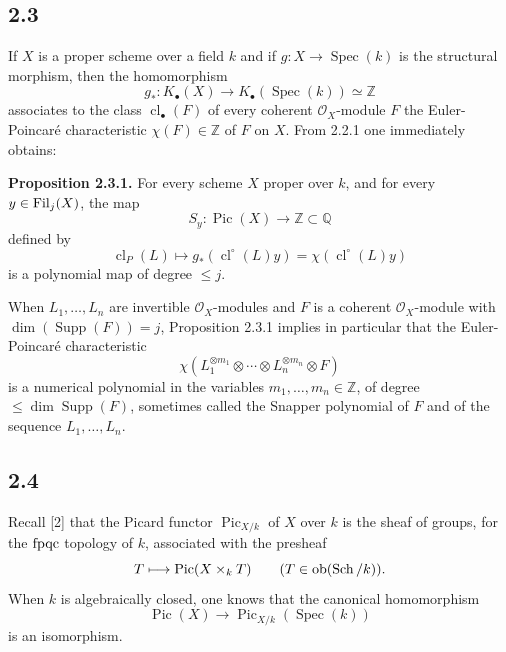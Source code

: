 \documentclass[11pt]{article}
\newcommand{\cl}{\operatorname{cl}}
\newcommand{\Spec}{\operatorname{Spec}}
\providecommand{\Pic}{\operatorname{Pic}}
\providecommand{\Supp}{\operatorname{Supp}}
\begin{document}
\subsection*{2.3}
If $X$ is a proper scheme over a field $k$ and if $g:X\to\Spec(k)$ is the structural morphism, then the homomorphism
\[
 g_*:K_\bullet(X)\longrightarrow K_\bullet(\Spec(k))\simeq\mathbb Z
\]
associates to the class $\cl_\bullet(F)$ of every coherent $\mathcal O_X$-module $F$ the Euler-Poincaré characteristic $\chi(F)\in\mathbb Z$ of $F$ on $X$. From 2.2.1 one immediately obtains:

\textbf{Proposition 2.3.1.} For every scheme $X$ proper over $k$, and for every $y\in\Filt_j(X)$, the map
\[
 S_y:\Pic(X)\longrightarrow\mathbb Z\subset\mathbb Q
\]
defined by
\[
 \cl_P(L)\longmapsto g_*(\cl^\circ(L)y)=\chi(\cl^\circ(L)y)
\]
is a polynomial map of degree $\leq j$.

When $L_1,\ldots,L_n$ are invertible $\mathcal O_X$-modules and $F$ is a coherent $\mathcal O_X$-module with $\dim(\Supp(F))=j$, Proposition 2.3.1 implies in particular that the Euler-Poincaré characteristic
\begin{equation}\tag{2.3.2}
 \chi(L_1^{\otimes m_1}\otimes\cdots\otimes L_n^{\otimes m_n}\otimes F)
\end{equation}
is a numerical polynomial in the variables $m_1,\ldots,m_n\in\mathbb Z$, of degree $\leq \dim\Supp(F)$, sometimes called the Snapper polynomial of $F$ and of the sequence $L_1,\ldots,L_n$.

\subsection*{2.4}
Recall [2] that the Picard functor $\Pic_{X/k}$ of $X$ over $k$ is the sheaf of groups, for the $\fpqc$ topology of $k$, associated with the presheaf
\[
 T\longmapsto \Pic(X\times_k T)\qquad (T\in\Ob(\Sch/k)).
\]
When $k$ is algebraically closed, one knows that the canonical homomorphism
\[
 \Pic(X)\longrightarrow \Pic_{X/k}(\Spec(k))
\]
is an isomorphism.



\providecommand{\Filt}{\operatorname{Fil}}
\providecommand{\fpqc}{\mathrm{fpqc}}
\providecommand{\Sch}{\operatorname{Sch}}
\providecommand{\Ob}{\operatorname{ob}}
\providecommand{\Gm}{\mathbb G_m}
\providecommand{\Der}{\operatorname{Der}}
\providecommand{\SL}{\operatorname{SL}}
\providecommand{\Aut}{\operatorname{Aut}}
\providecommand{\Mod}{\operatorname{Mod}}
\providecommand{\Tors}{\operatorname{Tors}}
\providecommand{\Mat}{\operatorname{Mat}}
\providecommand{\len}{\operatorname{length}}
\providecommand{\red}{\mathrm{red}}
\providecommand{\id}{\operatorname{id}}
\providecommand{\Spec}{\operatorname{Spec}}
\providecommand{\Picf}{\operatorname{Pic}}
\providecommand{\Ens}{\operatorname{Ens}}
\providecommand{\clp}{\operatorname{cl}_{P}}
\providecommand{\clo}{\operatorname{cl}^{\circ}}
\providecommand{\clb}{\operatorname{cl}_{\bullet}}
\providecommand{\Grb}{\operatorname{Gr}_{\bullet}}
\providecommand{\Gro}{\operatorname{Gr}^{\circ}}
\providecommand{\longO}[1]{\operatorname{length}_{#1}}
\end{document}
